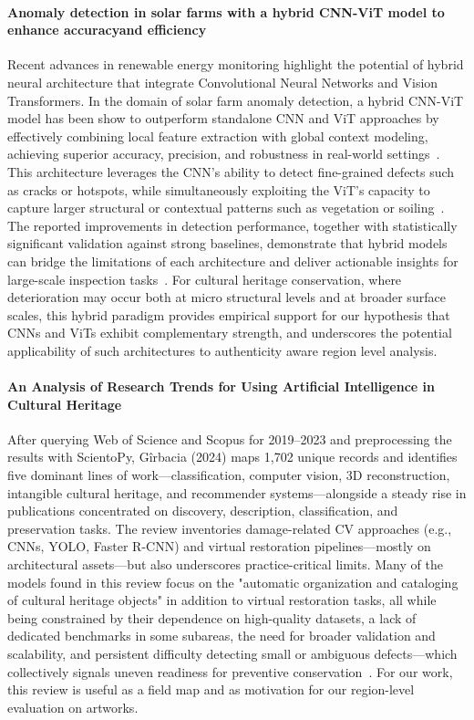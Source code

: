 \documentclass[conference]{IEEEtran}
\begin{document}
\paragraph*{Anomaly detection in solar farms with a hybrid CNN-ViT model to enhance accuracyand efficiency}
Recent advances in renewable energy monitoring highlight the potential of hybrid neural architecture that integrate Convolutional Neural Networks and Vision Transformers. In the domain of solar farm anomaly detection, a hybrid CNN-ViT model has been show to outperform standalone CNN and ViT approaches by effectively combining local feature extraction with global context modeling, achieving superior accuracy, precision, and robustness in real-world settings~\cite{darban_anomaly_2025}. This architecture leverages the CNN's ability to detect fine-grained defects such as cracks or hotspots, while simultaneously exploiting the ViT's capacity to capture larger structural or contextual patterns such as vegetation or soiling~\cite{darban_anomaly_2025}. The reported improvements in detection performance, together with statistically significant validation against strong baselines, demonstrate that hybrid models can bridge the limitations of each architecture and deliver actionable insights for large-scale inspection tasks~\cite{darban_anomaly_2025}. For cultural heritage conservation, where deterioration may occur both at micro structural levels and at broader surface scales, this hybrid paradigm provides empirical support for our hypothesis that CNNs and ViTs exhibit complementary strength, and underscores the potential applicability of such architectures to authenticity aware region level analysis.


\medskip
\paragraph*{An Analysis of Research Trends for Using Artificial Intelligence in Cultural Heritage}

After querying Web of Science and Scopus for 2019–2023 and preprocessing the results with ScientoPy, Gîrbacia (2024) maps 1,702 unique records and identifies five dominant lines of work—classification, computer vision, 3D reconstruction, intangible cultural heritage, and recommender systems—alongside a steady rise in publications concentrated on discovery, description, classification, and preservation tasks. The review inventories damage-related CV approaches (e.g., CNNs, YOLO, Faster R-CNN) and virtual restoration pipelines—mostly on architectural assets—but also underscores practice-critical limits. Many of the models found in this review focus on the "automatic organization and cataloging of cultural heritage objects" in addition to virtual restoration tasks, all while being constrained by their dependence on high-quality datasets, a lack of dedicated benchmarks in some subareas, the need for broader validation and scalability, and persistent difficulty detecting small or ambiguous defects—which collectively signals uneven readiness for preventive conservation~\cite{girbacia_analysis_2024}. For our work, this review is useful as a field map and as motivation for our region-level evaluation on artworks.
\end{document}
